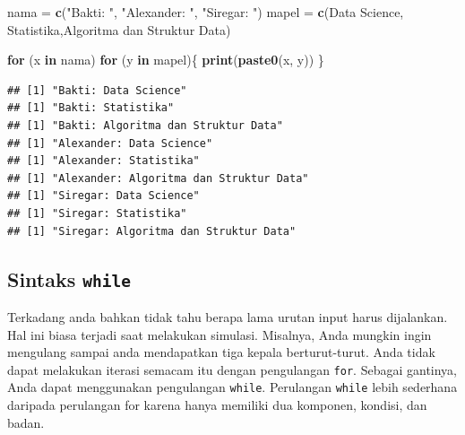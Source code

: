 \documentclass[
]{book}
\newenvironment{Shaded}{\begin{snugshade}}{\end{snugshade}}
\newcommand{\ControlFlowTok}[1]{\textcolor[rgb]{0.13,0.29,0.53}{\textbf{#1}}}
\newcommand{\FunctionTok}[1]{\textcolor[rgb]{0.13,0.29,0.53}{\textbf{#1}}}
\newcommand{\NormalTok}[1]{#1}
\newcommand{\OtherTok}[1]{\textcolor[rgb]{0.56,0.35,0.01}{#1}}
\newcommand{\StringTok}[1]{\textcolor[rgb]{0.31,0.60,0.02}{#1}}
\begin{document}
\begin{Shaded}
\begin{Highlighting}[]
\NormalTok{nama }\OtherTok{=} \FunctionTok{c}\NormalTok{(}\StringTok{"Bakti: "}\NormalTok{, }\StringTok{"Alexander: "}\NormalTok{, }\StringTok{"Siregar: "}\NormalTok{)}
\NormalTok{mapel }\OtherTok{=} \FunctionTok{c}\NormalTok{(}\StringTok{\textquotesingle{}Data Science\textquotesingle{}}\NormalTok{, }\StringTok{\textquotesingle{}Statistika\textquotesingle{}}\NormalTok{,}\StringTok{\textquotesingle{}Algoritma dan Struktur Data\textquotesingle{}}\NormalTok{)}

\ControlFlowTok{for}\NormalTok{ (x }\ControlFlowTok{in}\NormalTok{ nama)}
  \ControlFlowTok{for}\NormalTok{ (y }\ControlFlowTok{in}\NormalTok{ mapel)\{}
    \FunctionTok{print}\NormalTok{(}\FunctionTok{paste0}\NormalTok{(x, y))}
\NormalTok{  \}}
\end{Highlighting}
\end{Shaded}

\begin{verbatim}
## [1] "Bakti: Data Science"
## [1] "Bakti: Statistika"
## [1] "Bakti: Algoritma dan Struktur Data"
## [1] "Alexander: Data Science"
## [1] "Alexander: Statistika"
## [1] "Alexander: Algoritma dan Struktur Data"
## [1] "Siregar: Data Science"
## [1] "Siregar: Statistika"
## [1] "Siregar: Algoritma dan Struktur Data"
\end{verbatim}

\hypertarget{sintaks-while}{%
\subsection{\texorpdfstring{Sintaks \texttt{while}}{Sintaks while}}\label{sintaks-while}}

Terkadang anda bahkan tidak tahu berapa lama urutan input harus dijalankan. Hal ini biasa terjadi saat melakukan simulasi. Misalnya, Anda mungkin ingin mengulang sampai anda mendapatkan tiga kepala berturut-turut. Anda tidak dapat melakukan iterasi semacam itu dengan pengulangan \texttt{for}. Sebagai gantinya, Anda dapat menggunakan pengulangan \texttt{while}. Perulangan \texttt{while} lebih sederhana daripada perulangan for karena hanya memiliki dua komponen, kondisi, dan badan.
\end{document}
